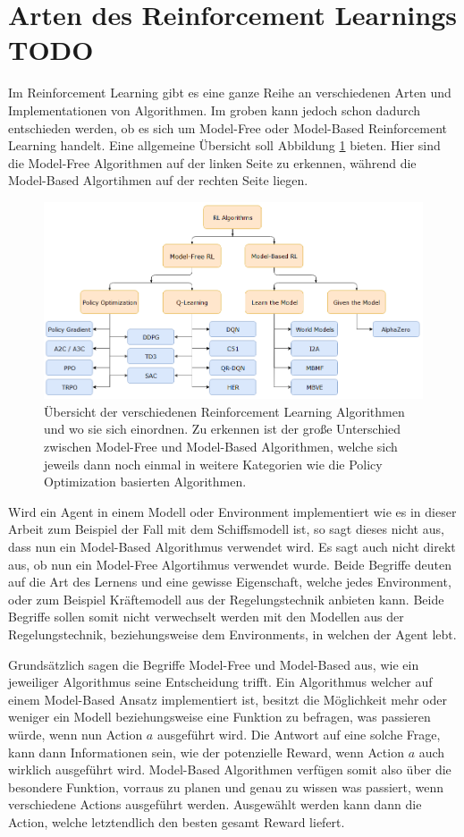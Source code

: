 \documentclass[]{iat}
\begin{document}
\section{Arten des Reinforcement Learnings TODO} \label{sec:arten_rf}
Im Reinforcement Learning gibt es eine ganze Reihe an verschiedenen Arten und Implementationen von Algorithmen. Im groben kann jedoch schon dadurch entschieden werden, ob es sich um Model-Free oder Model-Based Reinforcement Learning handelt. Eine allgemeine Übersicht soll Abbildung \ref{abb:rl_overview} bieten. Hier sind die Model-Free Algorithmen auf der linken Seite zu erkennen, während die Model-Based Algortihmen auf der rechten Seite liegen.
\begin{figure}[H]
    \includegraphics[width=\textwidth]{graphics/rl_overview.png}
    \centering
    \caption{Übersicht der verschiedenen Reinforcement Learning Algorithmen und wo sie sich einordnen. Zu erkennen ist der große Unterschied zwischen Model-Free und Model-Based Algorithmen, welche sich jeweils dann noch einmal in weitere Kategorien wie die Policy Optimization basierten Algorithmen. \cite[]{SpinningUp2018}}
    \label{abb:rl_overview}
\end{figure}
Wird ein Agent in einem Modell oder Environment implementiert wie es in dieser Arbeit zum Beispiel der Fall mit dem Schiffsmodell ist, so sagt dieses nicht aus, dass nun ein Model-Based Algorithmus verwendet wird. Es sagt auch nicht direkt aus, ob nun ein Model-Free Algortihmus verwendet wurde. Beide Begriffe deuten auf die Art des Lernens und eine gewisse Eigenschaft, welche jedes Environment, oder zum Beispiel Kräftemodell aus der Regelungstechnik anbieten kann. Beide Begriffe sollen somit nicht verwechselt werden mit den Modellen aus der Regelungstechnik, beziehungsweise dem Environments, in welchen der Agent lebt.

Grundsätzlich sagen die Begriffe Model-Free und Model-Based aus, wie ein jeweiliger Algorithmus seine Entscheidung trifft. Ein Algorithmus welcher auf einem Model-Based Ansatz implementiert ist, besitzt die Möglichkeit mehr oder weniger ein Modell beziehungsweise eine Funktion zu befragen, was passieren würde, wenn nun Action $a$ ausgeführt wird. Die Antwort auf eine solche Frage, kann dann Informationen sein, wie der potenzielle Reward, wenn Action $a$ auch wirklich ausgeführt wird. Model-Based Algorithmen verfügen somit also über die besondere Funktion, vorraus zu planen und genau zu wissen was passiert, wenn verschiedene Actions ausgeführt werden. Ausgewählt werden kann dann die Action, welche letztendlich den besten gesamt Reward liefert.
\end{document}
